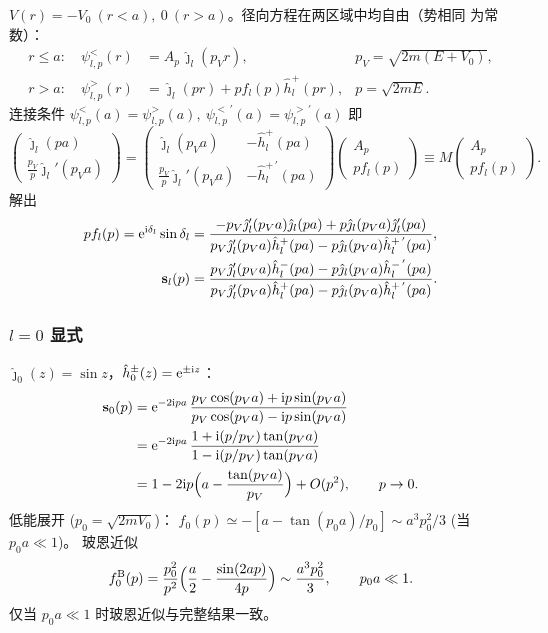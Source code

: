 $V(r)=-V_0\ (r<a),\ 0\ (r>a)$。径向方程在两区域中均自由（势相同
为常数）：
\begin{align}
r\le a:\quad \psi_{l,p}^{<}(r)&=A_p\,\hat\jmath_l(p_V r),
   & p_V=\sqrt{2m(E+V_0)},\\
r>a:\quad \psi_{l,p}^{>}(r)&=\hat\jmath_l(pr)+pf_l(p)\hat h_l^+(pr),
   & p=\sqrt{2mE}.
\end{align}
连接条件 $\psi_{l,p}^{<}(a)=\psi_{l,p}^{>}(a),\ \psi_{l,p}^{<\,'}(a)=\psi_{l,p}^{>\,'}(a)$
即
\[
\begin{pmatrix}\hat\jmath_l(pa)\\ \frac{p_V}{p}\hat\jmath_l'(p_V a)\end{pmatrix}
=
\begin{pmatrix}\hat\jmath_l(p_V a)& -\hat h_l^+(pa)\\
\frac{p_V}{p}\hat\jmath_l'(p_V a)& -\hat h_l^{+\,'}(pa)\end{pmatrix}
\begin{pmatrix}A_p\\ pf_l(p)\end{pmatrix}\equiv M\begin{pmatrix}A_p\\ pf_l(p)\end{pmatrix}.
\]
解出
\begin{align}
pf_l(p)=\mathrm{e}^{\mathrm{i}\delta_l}\sin\delta_l
&= \frac{-p_V\hat\jmath_l'(p_V a)\hat\jmath_l(pa)+p\hat\jmath_l(p_V a)\hat\jmath_l'(pa)}
   {p_V\hat\jmath_l'(p_V a)\hat h_l^+(pa)-p\hat\jmath_l(p_V a)\hat h_l^{+\,'}(pa)},\label{eq:sw-fl}\\
\mathbf s_l(p)
&= \frac{p_V\hat\jmath_l'(p_V a)\hat h_l^-(pa)-p\hat\jmath_l(p_V a)\hat h_l^{-\,'}(pa)}
   {p_V\hat\jmath_l'(p_V a)\hat h_l^+(pa)-p\hat\jmath_l(p_V a)\hat h_l^{+\,'}(pa)}.\label{eq:sw-sl}
\end{align}

\subsubsection*{$l=0$ 显式}

$\hat\jmath_0(z)=\sin z$，$\hat h_0^\pm(z)=\mathrm{e}^{\pm\mathrm{i} z}$：
\begin{align}
\mathbf s_0(p)
&= \mathrm{e}^{-2\mathrm{i} pa}\,
   \frac{p_V\cos(p_V a)+\mathrm{i} p\sin(p_V a)}{p_V\cos(p_V a)-\mathrm{i} p\sin(p_V a)}\nonumber\\
&= \mathrm{e}^{-2\mathrm{i} pa}\,\frac{1+\mathrm{i}(p/p_V)\tan(p_V a)}{1-\mathrm{i}(p/p_V)\tan(p_V a)}\nonumber\\
&= 1-2\mathrm{i} p\Bigl(a-\frac{\tan(p_V a)}{p_V}\Bigr)+O(p^2),\qquad
   p\to 0.
\end{align}
低能展开 ($p_0=\sqrt{2mV_0}$)：
$f_0(p)\simeq -[a-\tan(p_0a)/p_0]\sim a^3p_0^2/3$ (当 $p_0a\ll1$)。
玻恩近似
\[
f_0^{\rm B}(p)=\frac{p_0^2}{p^2}\Bigl(\frac{a}{2}-\frac{\sin(2ap)}{4p}\Bigr)
\sim\frac{a^3p_0^2}{3},\qquad p_0a\ll1.
\]
仅当 $p_0a\ll 1$ 时玻恩近似与完整结果一致。

